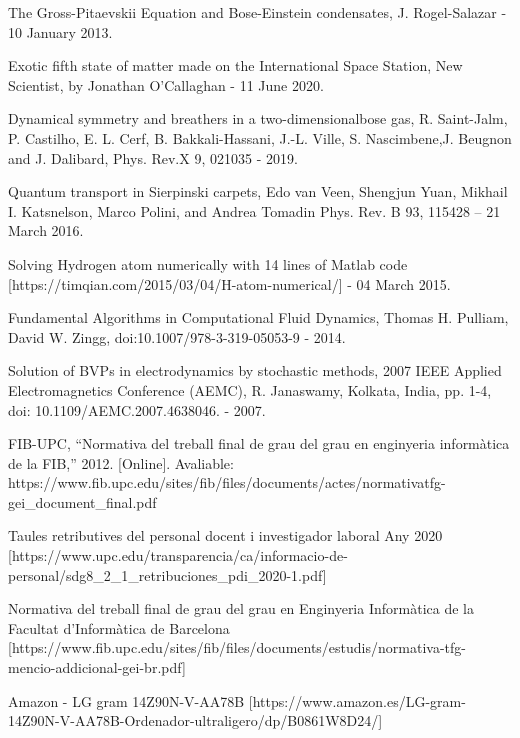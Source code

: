 \documentclass{article}
\begin{document}
\begin{thebibliography}{9}

The Gross-Pitaevskii Equation and Bose-Einstein condensates, J. Rogel-Salazar - 10 January 2013.

Exotic fifth state of matter made on the International Space Station, New Scientist, by Jonathan O’Callaghan - 11 June 2020.

\bibitem{} Dynamical symmetry and breathers in a two-dimensionalbose gas,
R. Saint-Jalm, P. Castilho, E. L. Cerf, B. Bakkali-Hassani, J.-L. Ville, S. Nascimbene,J. Beugnon and J. Dalibard, Phys. Rev.X 9, 021035 - 2019.

\bibitem{} Quantum transport in Sierpinski carpets,
Edo van Veen, Shengjun Yuan, Mikhail I. Katsnelson, Marco Polini, and Andrea Tomadin
Phys. Rev. B 93, 115428 – 21 March 2016.

\bibitem{} Solving Hydrogen atom numerically with 14 lines of Matlab code 
[https://timqian.com/2015/03/04/H-atom-numerical/] - 04 March 2015.

\bibitem{} Fundamental Algorithms in Computational Fluid Dynamics, Thomas H. Pulliam, David W. Zingg, doi:10.1007/978-3-319-05053-9 - 2014.

\bibitem{} Solution of BVPs in electrodynamics by stochastic methods, 2007 IEEE Applied Electromagnetics Conference (AEMC), R. Janaswamy, Kolkata, India, pp. 1-4, doi: 10.1109/AEMC.2007.4638046. - 2007.

FIB-UPC, “Normativa del treball final de grau del grau en enginyeria informàtica de la FIB,” 2012. [Online]. Avaliable:  https://www.fib.upc.edu/sites/fib/files/documents/actes/normativatfg-gei\_document\_final.pdf

Taules retributives del personal docent i investigador laboral Any 2020  [https://www.upc.edu/transparencia/ca/informacio-de-personal/sdg8\_2\_1\_retribuciones\_pdi\_2020-1.pdf]

Normativa del treball final de grau del grau en Enginyeria Informàtica de la Facultat d’Informàtica de Barcelona [https://www.fib.upc.edu/sites/fib/files/documents/estudis/normativa-tfg-mencio-addicional-gei-br.pdf]

Amazon - LG gram 14Z90N-V-AA78B [https://www.amazon.es/LG-gram-14Z90N-V-AA78B-Ordenador-ultraligero/dp/B0861W8D24/]


\end{thebibliography}
\end{document}
